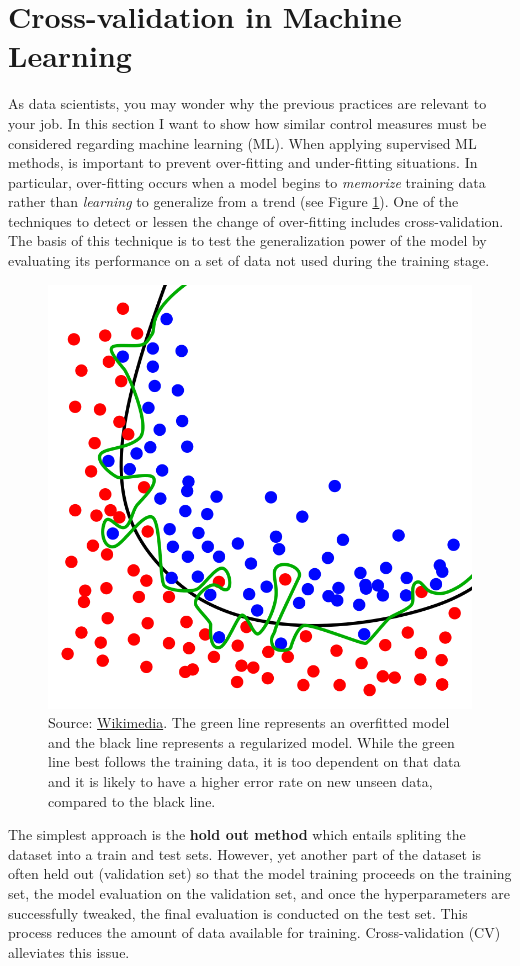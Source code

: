 \documentclass[
]{book}
\begin{document}
\hypertarget{cross-validation-in-machine-learning}{%
\section{Cross-validation in Machine Learning}\label{cross-validation-in-machine-learning}}

As data scientists, you may wonder why the previous practices are relevant to your job. In this section I want to show how similar control measures must be considered regarding machine learning (ML). When applying supervised ML methods, is important to prevent over-fitting and under-fitting situations. In particular, over-fitting occurs when a model begins to \emph{memorize} training data rather than \emph{learning} to generalize from a trend (see Figure \ref{fig:overfitting}). One of the techniques to detect or lessen the change of over-fitting includes cross-validation. The basis of this technique is to test the generalization power of the model by evaluating its performance on a set of data not used during the training stage.



\begin{figure}

{\centering \includegraphics[width=0.45\linewidth]{Figures/Overfitting} 

}

\caption{Source: \href{https://en.wikipedia.org/wiki/File:Overfitting.svg}{Wikimedia}. The green line represents an overfitted model and the black line represents a regularized model. While the green line best follows the training data, it is too dependent on that data and it is likely to have a higher error rate on new unseen data, compared to the black line.}\label{fig:overfitting}
\end{figure}

The simplest approach is the \textbf{hold out method} which entails spliting the dataset into a train and test sets. However, yet another part of the dataset is often held out (validation set) so that the model training proceeds on the training set, the model evaluation on the validation set, and once the hyperparameters are successfully tweaked, the final evaluation is conducted on the test set. This process reduces the amount of data available for training. Cross-validation (CV) alleviates this issue.
\end{document}
